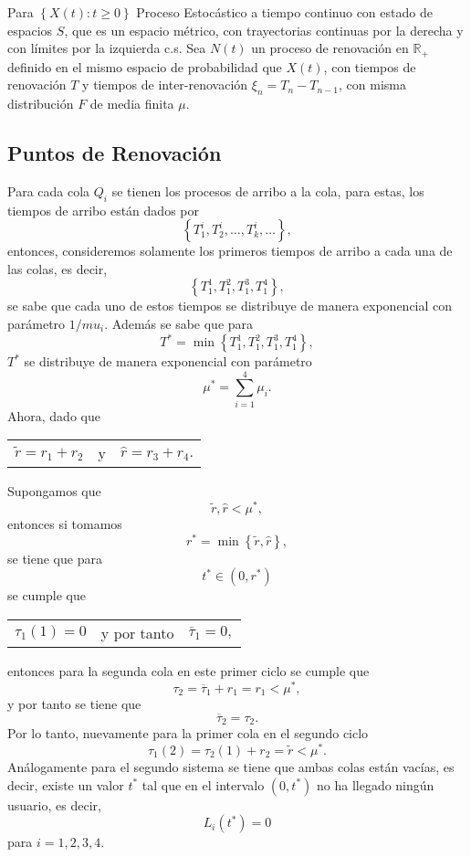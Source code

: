 \documentclass{article}
\newcommand{\rea}{\mathbb{R}}
\begin{document}
Para $\left\{X\left(t\right):t\geq0\right\}$ Proceso Estoc\'astico a tiempo continuo con estado de espacios $S$, que es un espacio m\'etrico, con trayectorias continuas por la derecha y con l\'imites por la izquierda c.s. Sea $N\left(t\right)$ un proceso de renovaci\'on en $\rea_{+}$ definido en el mismo espacio de probabilidad que $X\left(t\right)$, con tiempos de renovaci\'on $T$ y tiempos de inter-renovaci\'on $\xi_{n}=T_{n}-T_{n-1}$, con misma distribuci\'on $F$ de media finita $\mu$.
\subsection{Puntos de Renovaci\'on}

Para cada cola $Q_{i}$ se tienen los procesos de arribo a la cola, para estas, los tiempos de arribo est\'an dados por $$\left\{T_{1}^{i},T_{2}^{i},\ldots,T_{k}^{i},\ldots\right\},$$ entonces, consideremos solamente los primeros tiempos de arribo a cada una de las colas, es decir, $$\left\{T_{1}^{1},T_{1}^{2},T_{1}^{3},T_{1}^{4}\right\},$$ se sabe que cada uno de estos tiempos se distribuye de manera exponencial con par\'ametro $1/mu_{i}$. Adem\'as se sabe que para $$T^{*}=\min\left\{T_{1}^{1},T_{1}^{2},T_{1}^{3},T_{1}^{4}\right\},$$ $T^{*}$ se distribuye de manera exponencial con par\'ametro $$\mu^{*}=\sum_{i=1}^{4}\mu_{i}.$$ Ahora, dado que 
\begin{center}
\begin{tabular}{lcl}
$\tilde{r}=r_{1}+r_{2}$ & y &$\hat{r}=r_{3}+r_{4}.$
\end{tabular}
\end{center}


Supongamos que $$\tilde{r},\hat{r}<\mu^{*},$$ entonces si tomamos $$r^{*}=\min\left\{\tilde{r},\hat{r}\right\},$$ se tiene que para  $$t^{*}\in\left(0,r^{*}\right)$$ se cumple que 
\begin{center}
\begin{tabular}{lcl}
$\tau_{1}\left(1\right)=0$ & y por tanto & $\overline{\tau}_{1}=0,$
\end{tabular}
\end{center}
entonces para la segunda cola en este primer ciclo se cumple que $$\tau_{2}=\overline{\tau}_{1}+r_{1}=r_{1}<\mu^{*},$$ y por tanto se tiene que  $$\overline{\tau}_{2}=\tau_{2}.$$ Por lo tanto, nuevamente para la primer cola en el segundo ciclo $$\tau_{1}\left(2\right)=\tau_{2}\left(1\right)+r_{2}=\tilde{r}<\mu^{*}.$$ An\'alogamente para el segundo sistema se tiene que ambas colas est\'an vac\'ias, es decir, existe un valor $t^{*}$ tal que en el intervalo $\left(0,t^{*}\right)$ no ha llegado ning\'un usuario, es decir, $$L_{i}\left(t^{*}\right)=0$$ para $i=1,2,3,4$.
\end{document}
